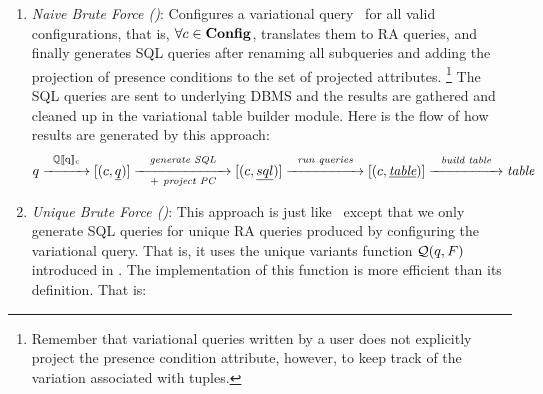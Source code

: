\begin{enumerate}
\item
\emph{Naive Brute Force (\nbf)}:
Configures a variational query \vQ\ for all valid configurations, that is, 
\ensuremath{\forall \config \in \confSet}, translates them to RA queries,
and finally generates SQL queries after renaming all subqueries and adding
the projection of presence conditions to the set of projected attributes.%
\footnote{Remember that variational queries written by a user does not explicitly
project the presence condition attribute, however, to keep track of the variation
associated with tuples.} 
The 
SQL queries are sent to underlying DBMS and the results are gathered and
cleaned up in the variational table builder module. Here is the flow of how results are generated by 
this approach:
%
\[
\vQ \mathrel{\mathop{\xrightarrow{\hspace*{1cm}}}^{\mathrm{\eeSem \vQ}}} [ ( \config, \pQ ) ] 
\mathrel{\mathop{\xrightarrow{\hspace*{2.3cm}}}^{\mathrm{\textit{generate SQL}}}_{\mathrm{+ \ \textit{project PC}}}} [ ( \config, \sqlQ ) ]
\mathrel{\mathop{\xrightarrow{\hspace*{1.8cm}}}^{\mathrm{\textit{run queries}}}
} [(\config,\underline{\textit{table}})]
\mathrel{\mathop{\xrightarrow{\hspace*{1.7cm}}}^{\mathrm{\textit{build table}}}
} \textit{table}
\]
%
%
\item
\emph{Unique Brute Force (\ubf)}:
This approach is just like \nbf\ except that we only generate SQL 
queries for unique RA queries produced by  configuring the variational query.
That is, it uses the unique variants function \ensuremath{\qGroup \vQ} introduced
in .
The implementation of this function is more efficient than its definition.
That is:

\end{enumerate}
